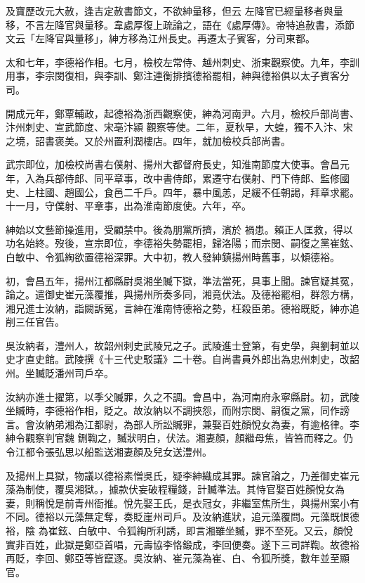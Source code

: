\begin{pinyinscope}
 及寶歷改元大赦，逢吉定赦書節文，不欲紳量移，但云
 左降官已經量移者與量移，不言左降官與量移。韋處厚復上疏論之，語在《處厚傳》。帝特追赦書，添節文云「左降官與量移」，紳方移為江州長史。再遷太子賓客，分司東都。



 太和七年，李德裕作相。七月，檢校左常侍、越州刺史、浙東觀察使。九年，李訓用事，李宗閔復相，與李訓、鄭注連衡排擯德裕罷相，紳與德裕俱以太子賓客分司。



 開成元年，鄭覃輔政，起德裕為浙西觀察使，紳為河南尹。六月，檢校戶部尚書、汴州刺史、宣武節度、宋亳汴潁
 觀察等使。二年，夏秋旱，大蝗，獨不入汴、宋之境，詔書褒美。又於州置利潤樓店。四年，就加檢校兵部尚書。



 武宗即位，加檢校尚書右僕射、揚州大都督府長史，知淮南節度大使事。會昌元年，入為兵部侍郎、同平章事，改中書侍郎，累遷守右僕射、門下侍郎、監修國史、上柱國、趙國公，食邑二千戶。四年，暴中風恙，足緩不任朝謁，拜章求罷。十一月，守僕射、平章事，出為淮南節度使。六年，卒。



 紳始以文藝節操進用，受顧禁中。後為朋黨所擠，濱於
 禍患。賴正人匡救，得以功名始終。歿後，宣宗即位，李德裕失勢罷相，歸洛陽；而宗閔、嗣復之黨崔鉉、白敏中、令狐綯欲置德裕深罪。大中初，教人發紳鎮揚州時舊事，以傾德裕。



 初，會昌五年，揚州江都縣尉吳湘坐贓下獄，準法當死，具事上聞。諫官疑其冤，論之。遣御史崔元藻覆推，與揚州所奏多同，湘竟伏法。及德裕罷相，群怨方構，湘兄進士汝納，詣闕訴冤，言紳在淮南恃德裕之勢，枉殺臣弟。德裕既貶，紳亦追削三任官告。



 吳汝納者，澧州人，故韶州刺史武陵兄之子。武陵進士登第，有史學，與劉軻並以史才直史館。武陵撰《十三代史駁議》二十卷。自尚書員外郎出為忠州刺史，改韶州。坐贓貶潘州司戶卒。



 汝納亦進士擢第，以季父贓罪，久之不調。會昌中，為河南府永寧縣尉。初，武陵坐贓時，李德裕作相，貶之。故汝納以不調挾怨，而附宗閔、嗣復之黨，同作謗言。會汝納弟湘為江都尉，為部人所訟贓罪，兼娶百姓顏悅女為妻，有逾格律。李紳令觀察判官魏
 鉶鞫之，贓狀明白，伏法。湘妻顏，顏繼母焦，皆笞而釋之。仍令江都令張弘思以船監送湘妻顏及兒女送澧州。



 及揚州上具獄，物議以德裕素憎吳氏，疑李紳織成其罪。諫官論之，乃差御史崔元藻為制使，覆吳湘獄。，據款伏妄破程糧錢，計贓準法。其恃官娶百姓顏悅女為妻，則稱悅是前青州衙推。悅先娶王氏，是衣冠女，非繼室焦所生，與揚州案小有不同。德裕以元藻無定奪，奏貶崖州司戶。及汝納進狀，追元藻覆問。元藻既恨德裕，陰
 為崔鉉、白敏中、令狐綯所利誘，即言湘雖坐贓，罪不至死。又云，顏悅實非百姓，此獄是鄭亞首唱，元壽協李恪鍛成，李回便奏。遂下三司詳鞫。故德裕再貶，李回、鄭亞等皆竄逐。吳汝納、崔元藻為崔、白、令狐所獎，數年並至顯官。




\end{pinyinscope}
